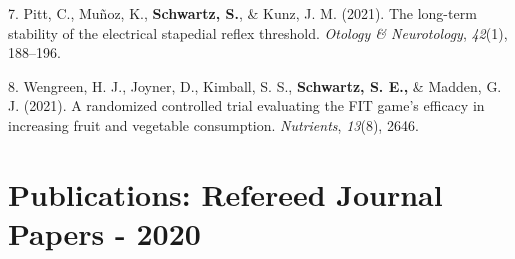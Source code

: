 \documentclass[11pt,a4paper,]{moderncv}
\newlength{\cslhangindent}
\newenvironment{CSLReferences}[2] %
 {\begin{list}{}{%
  \setlength{\itemindent}{0pt}
  \setlength{\leftmargin}{0pt}
  \setlength{\parsep}{0pt}
  \ifodd #1
   \setlength{\leftmargin}{\cslhangindent}
   \setlength{\itemindent}{-1\cslhangindent}
  \fi
  \setlength{\itemsep}{#2\baselineskip}}}
 {\end{list}}
\begin{document}
\begin{CSLReferences}{1}{0}
7. Pitt, C., Muñoz, K., \textbf{Schwartz, S.}, \& Kunz, J. M. (2021).
The long-term stability of the electrical stapedial reflex threshold.
\emph{Otology \& Neurotology}, \emph{42}(1), 188--196.

8. Wengreen, H. J., Joyner, D., Kimball, S. S.,
\textbf{Schwartz, S. E.,} \& Madden, G. J. (2021). A randomized
controlled trial evaluating the FIT game's efficacy in increasing fruit
and vegetable consumption. \emph{Nutrients}, \emph{13}(8), 2646.

\end{CSLReferences}

\endgroup

\vspace{7mm}

\section{Publications: Refereed Journal Papers -
2020}\label{publications-refereed-journal-papers---2020}

\begingroup
\setlength{\parindent}{-0.5in}
\setlength{\leftskip}{0.5in}
\end{document}
